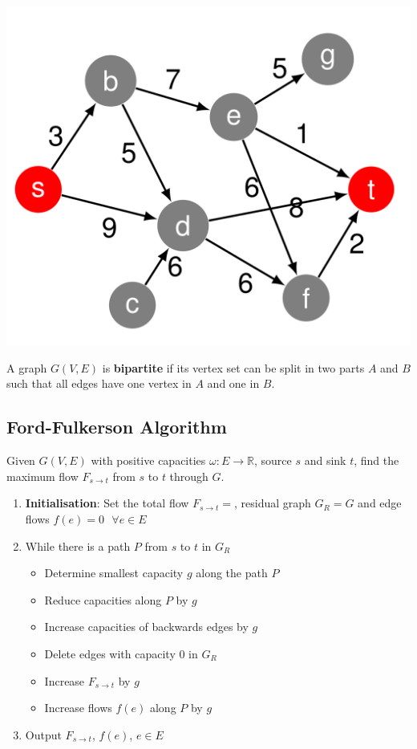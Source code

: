 \documentclass[11pt]{article}
\begin{document}
\begin{center}
	\includegraphics[width=0.6\linewidth]{img/network_flow_st}
\end{center}

\begin{theorem}
	A graph $G(V,E)$ is \textbf{bipartite} if its vertex set can be split in two parts $A$ and $B$ such that all edges have one vertex in $A$ and one in $B$.
\end{theorem}

\subsection{Ford-Fulkerson Algorithm}
Given $G(V,E)$ with positive capacities $\omega : E \rightarrow \mathbb{R}$, source $s$ and sink $t$, find the maximum flow $F_{s\rightarrow t}$ from $s$ to $t$ through $G$.
\begin{enumerate}
	\item \textbf{Initialisation}: Set the total flow $F_{s\rightarrow t} = $, residual graph $G_R = G$ and edge flows $f(e) = 0\text{ }\forall e\in E$
	\item While there is a path $P$ from $s$ to $t$ in $G_R$
	\begin{itemize}
		\item Determine smallest capacity $g$ along the path $P$
		\item Reduce capacities along $P$ by $g$
		\item Increase capacities of backwards edges by $g$
		\item Delete edges with capacity $0$ in $G_R$
		\item Increase $F_{s\rightarrow t}$ by $g$
		\item Increase flows $f(e)$ along $P$ by $g$
	\end{itemize}
	\item Output $F_{s\rightarrow t}$, $f(e)$, $e\in E$
\end{enumerate}
\end{document}
